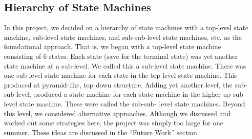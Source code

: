 \subsection{Hierarchy of State Machines}
\label{sec:hier-state-mach-1}

In this project, we decided on a hierarchy of state machines with a top-level state machine,
sub-level state machines, and sub-sub-level state machines, etc. as the foundational approach.
That is, we began with a top-level state machine consisting of 6 states. Each state (save for the
terminal state) was yet another state machine at a sub-level. We called this a sub-level state machine.
There was one sub-level state machine for each state in the top-level state machine. This produced at
pyramid-like, top down structure. Adding yet another level, the sub-sub-level, produced a state
machine for each state machine in the higher-up sub-level state machine. These were called the sub-sub-
level state machines. Beyond this level, we considered alternative approaches. Although we discussed
and worked out some strategies here, the project was simply too large for one summer. These ideas are
discussed in the “Future Work” section.

